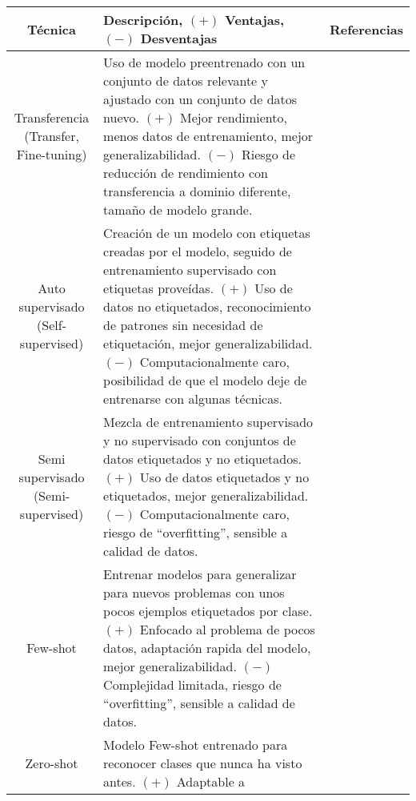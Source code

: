\begin{center}
    \begin{table}[ht!]
        \small
        \begin{tabular}{ |c|m{9.5cm}|c| }
            \hline
            \bf Técnica & \bf Descripción, $(+)$ Ventajas, $(-)$ Desventajas & \bf Referencias \\
            \hline
            \makecell{Transferencia \\ (Transfer, Fine-tuning)} & Uso de modelo preentrenado con un conjunto de datos
            relevante y ajustado con un conjunto de datos nuevo. $(+)$ Mejor rendimiento, menos datos de entrenamiento,
            mejor generalizabilidad. $(-)$ Riesgo de reducción de rendimiento con transferencia a dominio diferente,
            tamaño de modelo grande. & \makecell{\autocite{safonova-2023,maggiori-2016-0,castelluccio-2015} \\
            \autocite{nogueira-2017,zhong-2016,amato-2023}} \\
            \hline
            \makecell{Auto supervisado \\ (Self-supervised)} & Creación de un modelo con etiquetas creadas por el
            modelo, seguido de entrenamiento supervisado con etiquetas proveídas. $(+)$ Uso de datos no etiquetados,
            reconocimiento de patrones sin necesidad de etiquetación, mejor generalizabilidad. $(-)$ Computacionalmente
            caro, posibilidad de que el modelo deje de entrenarse con algunas técnicas. & \autocite{safonova-2023} \\
            \hline
            \makecell{Semi supervisado \\ (Semi-supervised)} & Mezcla de entrenamiento supervisado y no supervisado con
            conjuntos de datos etiquetados y no etiquetados. $(+)$ Uso de datos etiquetados y no etiquetados, mejor
            generalizabilidad. $(-)$ Computacionalmente caro, riesgo de \enquote{overfitting}, sensible a calidad de
            datos. & \autocite{safonova-2023} \\
            \hline
            Few-shot & Entrenar modelos para generalizar para nuevos problemas con unos pocos ejemplos etiquetados por
            clase. $(+)$ Enfocado al problema de pocos datos, adaptación rapida del modelo, mejor generalizabilidad.
            $(-)$ Complejidad limitada, riesgo de \enquote{overfitting}, sensible a calidad de datos. &
            \autocite{safonova-2023} \\
            \hline
            Zero-shot & Modelo Few-shot entrenado para reconocer clases que nunca ha visto antes. $(+)$ Adaptable a

\end{tabular}
\end{table}
\end{center}
